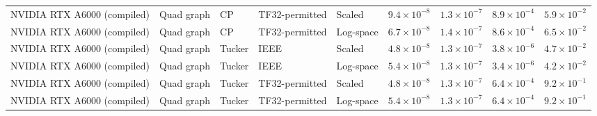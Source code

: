 \begin{tabular}{lllllrrrr}
NVIDIA RTX A6000 (compiled) & Quad graph & CP & TF32-permitted & Scaled & $9.4\mathbin{\times}10^{-8}$ & $1.3\mathbin{\times}10^{-7}$ & $8.9\mathbin{\times}10^{-4}$ & $5.9\mathbin{\times}10^{-2}$ \\
NVIDIA RTX A6000 (compiled) & Quad graph & CP & TF32-permitted & Log-space & $6.7\mathbin{\times}10^{-8}$ & $1.4\mathbin{\times}10^{-7}$ & $8.6\mathbin{\times}10^{-4}$ & $6.5\mathbin{\times}10^{-2}$ \\
NVIDIA RTX A6000 (compiled) & Quad graph & Tucker & IEEE & Scaled & $4.8\mathbin{\times}10^{-8}$ & $1.3\mathbin{\times}10^{-7}$ & $3.8\mathbin{\times}10^{-6}$ & $4.7\mathbin{\times}10^{-2}$ \\
NVIDIA RTX A6000 (compiled) & Quad graph & Tucker & IEEE & Log-space & $5.4\mathbin{\times}10^{-8}$ & $1.3\mathbin{\times}10^{-7}$ & $3.4\mathbin{\times}10^{-6}$ & $4.2\mathbin{\times}10^{-2}$ \\
NVIDIA RTX A6000 (compiled) & Quad graph & Tucker & TF32-permitted & Scaled & $4.8\mathbin{\times}10^{-8}$ & $1.3\mathbin{\times}10^{-7}$ & $6.4\mathbin{\times}10^{-4}$ & $9.2\mathbin{\times}10^{-1}$ \\
NVIDIA RTX A6000 (compiled) & Quad graph & Tucker & TF32-permitted & Log-space & $5.4\mathbin{\times}10^{-8}$ & $1.3\mathbin{\times}10^{-7}$ & $6.4\mathbin{\times}10^{-4}$ & $9.2\mathbin{\times}10^{-1}$ \\
\bottomrule
\end{tabular}
